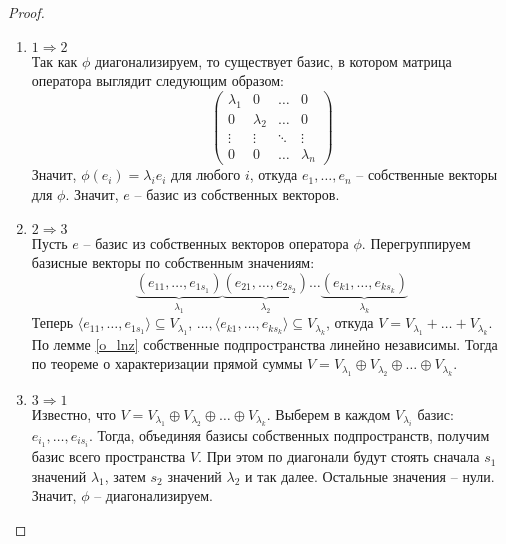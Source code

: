 \begin{proof}~
    \begin{enumerate}
        \item $1 \Rightarrow 2$ \\
        Так как $\phi$ диагонализируем, то существует базис, в котором матрица оператора выглядит 
        следующим образом:
        \begin{equation*}
        \left(
            \begin{array}{cccc}
            \lambda_{1} & 0 & \ldots & 0\\
            0 & \lambda_{2} & \ldots & 0\\
            \vdots & \vdots & \ddots & \vdots\\
            0 & 0 & \ldots & \lambda_n
            \end{array}
        \right)
        \end{equation*}
        Значит, $\phi(e_i) = \lambda_i e_i$ для любого $i$, откуда $e_1, \dots, e_n$ -- собственные 
        векторы для $\phi$. Значит, $e$ -- базис из собственных векторов.
        \item $2 \Rightarrow 3$ \\
        Пусть $e$ -- базис из собственных векторов оператора $\phi$. Перегруппируем базисные векторы 
        по собственным значениям: 
        $$\underbrace{(e_{11}, \dots, e_{1s_1})}_{\lambda_1} \underbrace{(e_{21}, \dots, e_{2s_2})}_{\lambda_2} 
        \dots \underbrace{(e_{k1}, \dots, e_{ks_k})}_{\lambda_k}$$
        Теперь $\langle e_{11}, \dots, e_{1s_1} \rangle \subseteq V_{\lambda_1}$, 
        $\dots, \langle e_{k1}, \dots, e_{ks_k} \rangle \subseteq V_{\lambda_k}$, 
        откуда $V = V_{\lambda_1} + \dots + V_{\lambda_k}$. По лемме \ref{o_lnz} собственные подпространства 
        линейно независимы. Тогда по теореме о характеризации прямой суммы 
        $V = V_{\lambda_1} \oplus V_{\lambda_2} \oplus \dots \oplus V_{\lambda_k}$.
        \item $3 \Rightarrow 1$ \\
        Известно, что $V = V_{\lambda_1} \oplus V_{\lambda_2} \oplus \dots \oplus V_{\lambda_k}$. 
        Выберем в каждом $V_{\lambda_i}$ базис: $e_{i_1}, \dots, e_{is_i}$. Тогда, объединяя базисы 
        собственных подпространств, получим базис всего пространства $V$. 
        При этом по диагонали будут стоять сначала $s_1$ значений $\lambda_1$, 
        затем $s_2$ значений $\lambda_2$ и так далее. Остальные значения -- нули. 
        Значит, $\phi$ -- диагонализируем.
        \begin{equation*}

\end{equation*}
\end{enumerate}
\end{proof}
